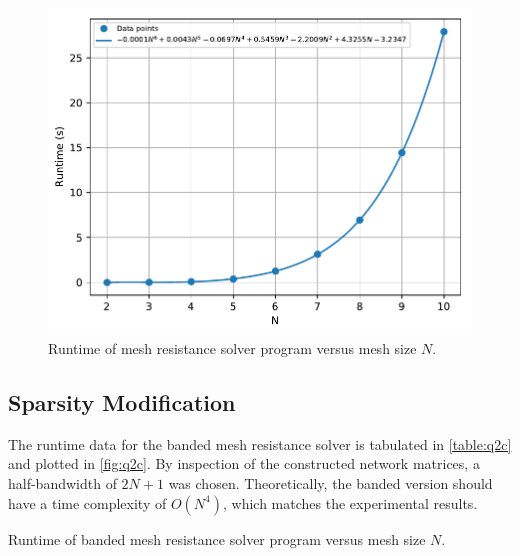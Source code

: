 \documentclass[a4paper,titlepage]{article}
\begin{document}
	\begin{figure}[!htb]
		\centering
		\includegraphics[width=\columnwidth]{plots/q2b.pdf}
		\caption
		{Runtime of mesh resistance solver program versus mesh size $N$.}
		\label{fig:q2b}
	\end{figure}
	
	\subsection{Sparsity Modification}
	
	The runtime data for the banded mesh resistance solver is tabulated in \autoref{table:q2c} and plotted in \autoref{fig:q2c}. By inspection of the constructed network matrices, a half-bandwidth of $2N + 1$ was chosen. Theoretically, the banded version should have a time complexity of $O(N^4)$, which matches the experimental results.
	
	\begin{table}[!htb]
		\centering
		\caption{Runtime of banded mesh resistance solver program versus mesh size $N$.}
		\label{table:q2c}
	\end{table}
\end{document}
